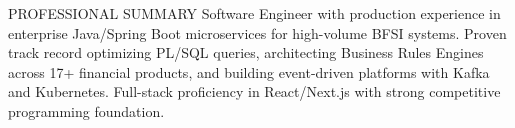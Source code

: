 \documentclass{resume} %
\begin{document}
\begin{rSection}{PROFESSIONAL SUMMARY}
    \vspace{-0.5em}
    Software Engineer with production experience in enterprise Java/Spring Boot microservices for high-volume BFSI systems. Proven track record optimizing PL/SQL queries, architecting Business Rules Engines across 17+ financial products, and building event-driven platforms with Kafka and Kubernetes. Full-stack proficiency in React/Next.js with strong competitive programming foundation.
\end{rSection}

\end{document}
